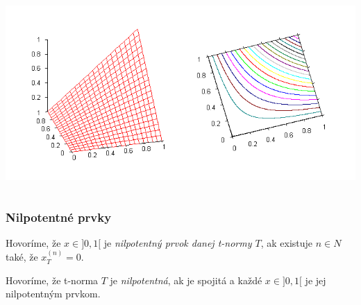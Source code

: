 \documentclass{beamer}
\begin{document}
\begin{frame}
\begin{columns}
\begin{minipage}[c][0.4\textheight][c]{\linewidth}
\end{minipage}
\begin{minipage}[c][0.4\textheight][c]{\linewidth}
  \centering
  \includegraphics[width=0.9\linewidth]{ProductTnorm}
\end{minipage}
\end{columns}
\end{frame}

\begin{frame}
\frametitle{Nilpotentné prvky}
\begin{definition}
Hovoríme, že $x \in ]0,1[$ je {\em nilpotentný prvok danej t-normy $T$}, ak existuje $n \in N$ také,
že $ x_T^{(n)} =0.$
\end{definition}
\begin{definition}
Hovoríme, že t-norma $T$ je {\em nilpotentná}, ak je spojitá a každé $x \in ]0,1[$ je jej nilpotentným prvkom.
\end{definition}
\end{frame}


\end{document}

